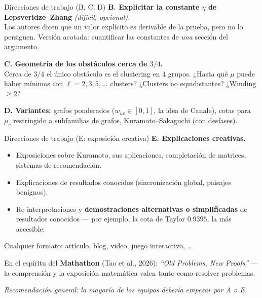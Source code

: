 \documentclass[10pt,aspectratio=169]{beamer}
\begin{document}
\begin{frame}{Direcciones de trabajo (B, C, D)}
\textbf{B. Explicitar la constante $\eta$ de Lepsveridze--Zhang} \emph{(difícil, opcional).}\\
Los autores dicen que un valor explícito es derivable de la prueba, pero no lo persiguen. Versión acotada: cuantificar las constantes de \emph{una} sección del argumento.
\medskip
\pause

\textbf{C. Geometría de los obstáculos cerca de $3/4$.}\\
Cerca de $3/4$ el único obstáculo es el clustering en 4 grupos. ¿Hasta qué $\mu$ puede haber mínimos con $\ell = 2, 3, 5, \dots$ clusters? ¿Clusters no equidistantes? ¿Winding $\ge 2$?
\medskip
\pause

\textbf{D. Variantes:} grafos ponderados ($w_{uv}\in[0,1]$, la idea de Canale), cotas para $\mu_c$ restringido a subfamilias de grafos, Kuramoto--Sakaguchi (con desfases).
\end{frame}

\begin{frame}{Direcciones de trabajo (E: exposición creativa)}
\textbf{E. Explicaciones creativas.}
\begin{itemize}
    \item Exposiciones sobre Kuramoto, sus aplicaciones, completación de matrices, sistemas de recomendación.
    \item Explicaciones de resultados conocidos (sincronización global, paisajes benignos).
    \item Re-interpretaciones y \textbf{demostraciones alternativas o simplificadas} de resultados conocidos --- por ejemplo, la cota de Taylor $0{.}9395$, la más accesible.
\end{itemize}
\medskip
\pause
Cualquier formato: artículo, blog, video, juego interactivo, \dots
\medskip

En el espíritu del \textbf{Mathathon} (Tao et al., 2026): \emph{``Old Problems, New Proofs''} --- la comprensión y la exposición matemática valen tanto como resolver problemas.
\medskip
\pause
\begin{center}
\emph{Recomendación general: la mayoría de los equipos debería empezar por A o E.}
\end{center}
\end{frame}
\end{document}

